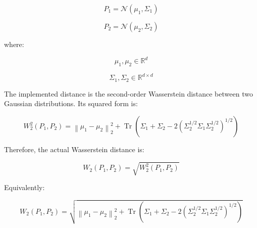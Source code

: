 \documentclass{book}
\begin{document}
        \[
            P_1
            =
            \mathcal{N}
            \left(
                \ensuremath{\mu}_1,
                \ensuremath{\Sigma}_1
            \right)
        \]
        
        \[
            P_2
            =
            \mathcal{N}
            \left(
                \ensuremath{\mu}_2,
                \ensuremath{\Sigma}_2
            \right)
        \]
        
        where:
        
        \[
            \ensuremath{\mu}_1, \ensuremath{\mu}_2 \in \mathbb{R}^{d}
        \]
        
        \[
            \ensuremath{\Sigma}_1, \ensuremath{\Sigma}_2 \in \mathbb{R}^{d \times d}
        \]
        
        The implemented distance is the second-order Wasserstein distance between two Gaussian distributions. Its squared form is:
        
        \[
            W_2^2
            \left(
                P_1,
                P_2
            \right)
            =
            \left\lVert
                \ensuremath{\mu}_1 - \ensuremath{\mu}_2
            \right\rVert_2^2
            +
            \operatorname{Tr}
            \left(
                \ensuremath{\Sigma}_1
            +
                \ensuremath{\Sigma}_2
            -
            2
                \left(
                    \ensuremath{\Sigma}_2^{1/2}
                    \ensuremath{\Sigma}_1
                    \ensuremath{\Sigma}_2^{1/2}
                \right)^{1/2}
            \right)
        \]
        
        Therefore, the actual Wasserstein distance is:
        
        \[
            W_2
            \left(
                P_1,
                P_2
            \right)
            =
            \sqrt{
                W_2^2
                \left(
                    P_1,
                    P_2
                \right)
            }
        \]
        
        Equivalently:
        
        \[
            W_2
            \left(
                P_1,
                P_2
            \right)
            =
            \sqrt{
                \left\lVert
                    \ensuremath{\mu}_1 - \ensuremath{\mu}_2
                \right\rVert_2^2
                +
                \operatorname{Tr}
                \left(
                    \ensuremath{\Sigma}_1
                +
                    \ensuremath{\Sigma}_2
                -
                2
                    \left(
                        \ensuremath{\Sigma}_2^{1/2}
                        \ensuremath{\Sigma}_1
                        \ensuremath{\Sigma}_2^{1/2}
                    \right)^{1/2}
                \right)
            }
        \]
    
\end{document}
